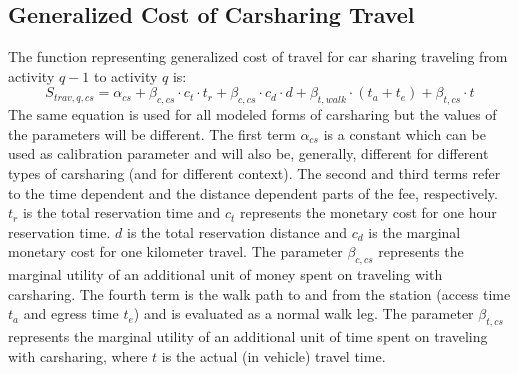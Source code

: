\subsection{Generalized Cost of Carsharing Travel}
The function representing generalized cost of travel for car sharing traveling from activity $q-1$ to activity $q$ is:
%
\begin{equation}
S_{trav, q, cs} = \alpha_{cs} + \beta_{c,cs} \cdot c_{t} \cdot t_r + \beta_{c,cs} \cdot c_d \cdot d + \beta_{t, walk} \cdot (t_a + t_e) + \beta_{t,cs} \cdot  t
\end{equation}
%
The same equation is used for all modeled forms of carsharing but the values of the parameters will be different. 
%
The first term $\alpha_{cs}$ is a constant which can be used as calibration parameter and will also be, generally, different for different types of carsharing (and for different context).
%
The second and third terms refer to the time dependent and the distance dependent parts of the fee, respectively. 
%
$t_r$ is the total reservation time and $c_t$ represents the monetary cost for one hour reservation time.
%
$d$ is the total reservation distance and $c_d$ is the marginal monetary cost for one kilometer travel. 
%
The parameter $\beta_{c,cs}$ represents the marginal utility of an additional unit of money spent on traveling with carsharing. 
%
The fourth term is the walk path to and from the station (access time $t_a$ and egress time $t_e$) and is evaluated as a normal walk leg. 
%
The parameter $\beta_{t,cs}$ represents the marginal utility of an additional unit of time spent on traveling with carsharing, where $t$ is the actual (in vehicle) travel time. 

